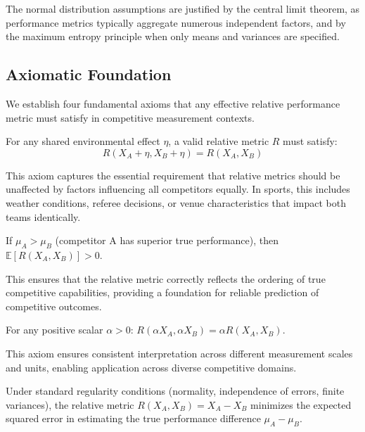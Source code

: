 The normal distribution assumptions are justified by the central limit theorem, as performance metrics typically aggregate numerous independent factors, and by the maximum entropy principle when only means and variances are specified.

\subsection{Axiomatic Foundation}

We establish four fundamental axioms that any effective relative performance metric must satisfy in competitive measurement contexts.

\begin{axiom}
For any shared environmental effect $\eta$, a valid relative metric $R$ must satisfy:
$$R(X_A + \eta, X_B + \eta) = R(X_A, X_B)$$
\end{axiom}

This axiom captures the essential requirement that relative metrics should be unaffected by factors influencing all competitors equally. In sports, this includes weather conditions, referee decisions, or venue characteristics that impact both teams identically.

\begin{axiom} 
If $\mu_A > \mu_B$ (competitor A has superior true performance), then $\mathbb{E}[R(X_A, X_B)] > 0$.
\end{axiom}

This ensures that the relative metric correctly reflects the ordering of true competitive capabilities, providing a foundation for reliable prediction of competitive outcomes.

\begin{axiom}
For any positive scalar $\alpha > 0$: $R(\alpha X_A, \alpha X_B) = \alpha R(X_A, X_B)$.
\end{axiom}

This axiom ensures consistent interpretation across different measurement scales and units, enabling application across diverse competitive domains.

\begin{axiom}
Under standard regularity conditions (normality, independence of errors, finite variances), the relative metric $R(X_A, X_B) = X_A - X_B$ minimizes the expected squared error in estimating the true performance difference $\mu_A - \mu_B$.
\end{axiom}

